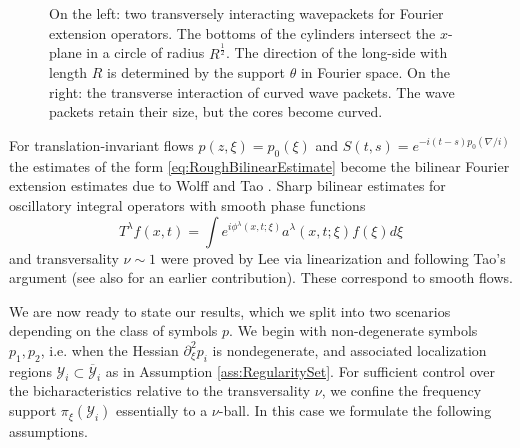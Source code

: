 \documentclass{amsart}
\theoremstyle{definition}
\begin{document}
\begin{figure}[ht!]
\begin{minipage}[t]{0.45\textwidth}
\begin{tikzpicture}[scale=1.1]
\end{tikzpicture}
        \label{fig:TransverseCurves}
    \end{minipage}
    \caption{On the left: two transversely interacting wavepackets for Fourier extension operators. The bottoms of the cylinders intersect the $x$-plane in a circle of radius $R^{\frac{1}{2}}$. The direction of the long-side with length $R$ is determined by the support $\theta$ in Fourier space. On the right: the transverse interaction of curved wave packets. The wave packets retain their size, but the cores become curved.}
\end{figure}

For translation-invariant flows $p(z,\xi) = p_0(\xi)$ and $S(t,s) = e^{-i(t-s) p_0(\nabla/i)}$ the estimates of the form \eqref{eq:RoughBilinearEstimate} become the bilinear Fourier extension estimates due to Wolff \cite{Wolff01} and Tao \cite{Tao03}. Sharp bilinear estimates for oscillatory integral operators with smooth phase functions
\begin{equation*}
T^\lambda f(x,t) = \int e^{i \phi^\lambda(x,t;\xi)} a^\lambda(x,t;\xi) f(\xi) d\xi
\end{equation*}
and transversality $\nu \sim 1$ were proved by Lee \cite{Lee2006} via linearization and following Tao's argument \cite{Tao03} (see also \cite{Bourgain1991I} for an earlier contribution). These correspond to smooth flows.

\bigskip
We are now ready to state our results, which 
we split into two scenarios depending on the 
class of symbols $p$.
We begin with non-degenerate symbols $p_1,p_2$, i.e. when the Hessian $\partial^2_\xi p_i$ is nondegenerate, and associated localization regions $\mathcal{Y}_{i} \subset \overline{\mathcal{Y}}_{i}$ as in Assumption \ref{ass:RegularitySet}.  For sufficient control over the bicharacteristics relative to the transversality $\nu$, we confine the frequency support $\pi_{\xi}(\mathcal{Y}_i)$ essentially to a $\nu$-ball. In this case we formulate the following assumptions.
\end{document}
